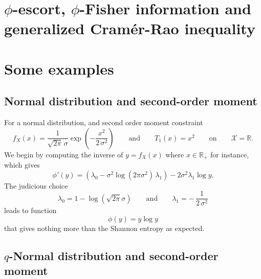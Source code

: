 \documentclass[english,onecolumn]{elsarticle}
\def\Rset{\mathbb{R}}
\def\X{\mathcal{X}}
\begin{document}

\section{$\phi$-escort,  $\phi$-Fisher information and  generalized Cram\'er-Rao
  inequality}
\label{sec:EscortCR}


\section{Some examples}
\label{sec:Examples}


\subsection{Normal distribution and second-order moment}
\label{subsec:NormalSecondOrder}

For a normal distribution, and second order moment constraint
%
\[
f_X(x) = \frac{1}{\sqrt{2 \pi} \, \sigma} \exp\left( - \frac{x^2}{2 \, \sigma^2}
\right) \qquad \mbox{and} \qquad T_1(x) = x^2 \qquad \mbox{on} \qquad \X =
\Rset.
\]
%
We begin  by computing the  inverse of  $y = f_X(x)$  where $x \in  \Rset_+$ for
instance,  which   gives
%
\[
\phi'(y) = \left( \lambda_0 - \sigma^2 \log(2 \pi \sigma^2) \, \lambda_1 \right)
- 2 \sigma^2 \lambda_1 \log y.
\]
%
The judicious choice
%
\[
\lambda_0 = 1 - \log(\sqrt{2 \pi} \sigma) \qquad \mbox{and} \qquad \lambda_1 = -
\, \frac{1}{2 \, \sigma^2}
\]
%
leads to function
%
\[
\phi(y) = y \log y
\]
%
that gives nothing more than the Shannon entropy as expected.



\subsection{$q$-Normal distribution and second-order moment}
\label{subsec:qNormalSecondOrder}
\end{document}
